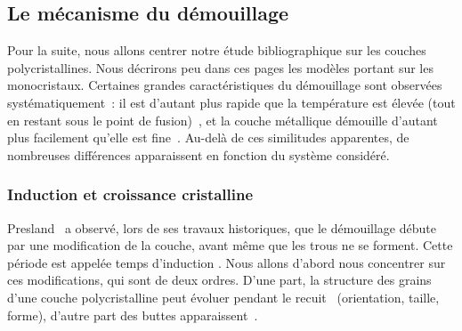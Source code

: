 	\subsection{Le mécanisme du démouillage}
	\label{sBiblioMeca}
Pour la suite, nous allons centrer notre étude bibliographique sur les couches polycristallines. Nous décrirons peu dans ces pages les modèles portant sur les monocristaux. Certaines grandes caractéristiques du démouillage sont observées systématiquement~: il est d'autant plus rapide que la température est élevée (tout en restant sous le point de fusion)~\cite{simrick2012thermal, morawiec2013self}, et la couche métallique démouille d'autant plus facilement qu'elle est fine~\cite{morawiec2013self, kim2002thickness, manuela2013dewetting}. Au-delà de ces similitudes apparentes, de nombreuses différences apparaissent en fonction du système considéré.\par 
		\subsubsection{Induction et croissance cristalline}

Presland~\cite{presland1972hillock} a observé, lors de ses travaux historiques, que le démouillage débute par une modification de la couche, avant même que les trous ne se forment. Cette période est appelée \og temps d'induction \fg. Nous allons d'abord nous concentrer sur ces modifications, qui sont de deux ordres. D'une part, la structure des grains d'une couche polycristalline peut évoluer pendant le recuit~\cite{thompson1990grain} (orientation, taille, forme), d'autre part des buttes apparaissent~\cite{sharma1980hillock, sharma1986hillock}.\par 

